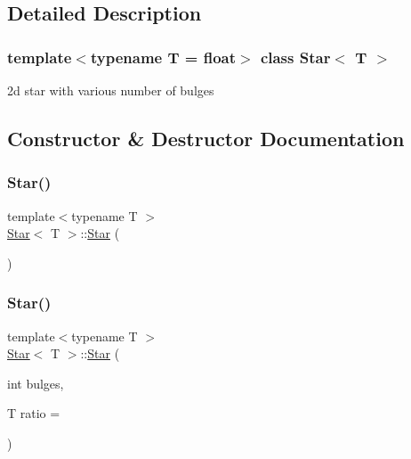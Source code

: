 \subsection{Detailed Description}
\subsubsection*{template$<$typename T = float$>$\newline
class Star$<$ T $>$}

2d star with various number of bulges 

\subsection{Constructor \& Destructor Documentation}
\mbox{\label{classStar_a4be07c82320f781071409294614df4ae}} 
\subsubsection{\texorpdfstring{Star()}{Star()}\hspace{0.1cm}{\footnotesize\ttfamily [1/8]}}
{\footnotesize\ttfamily template$<$typename T $>$ \\
\mbox{\hyperlink{classStar}{Star}}$<$ T $>$\+::\mbox{\hyperlink{classStar}{Star}} (\begin{DoxyParamCaption}{ }\end{DoxyParamCaption})}

\mbox{\label{classStar_aa179936ed93e38e70992cb4f6e3cbff3}} 
\subsubsection{\texorpdfstring{Star()}{Star()}\hspace{0.1cm}{\footnotesize\ttfamily [2/8]}}
{\footnotesize\ttfamily template$<$typename T $>$ \\
\mbox{\hyperlink{classStar}{Star}}$<$ T $>$\+::\mbox{\hyperlink{classStar}{Star}} (\begin{DoxyParamCaption}\item[{int}]{bulges,  }\item[{T}]{ratio = {} }\end{DoxyParamCaption})}

\mbox{\label{classStar_af518471484341cad6b47ad42d4e637fe}} 
